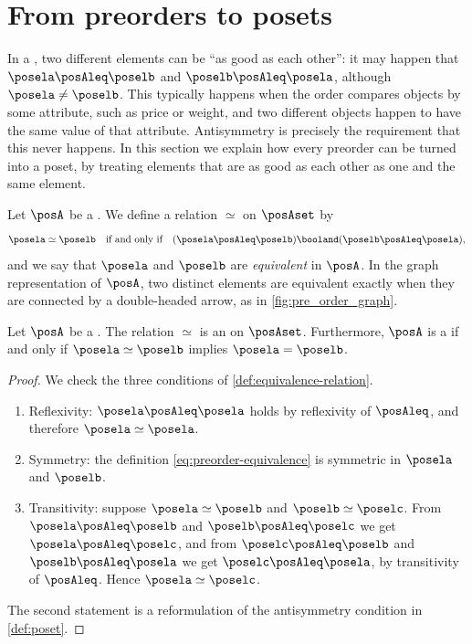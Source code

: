 
\section{From preorders to posets}
\label{sec:preorders-to-posets}

In a , two different elements can be ``as good as each other'': it may happen that $\posela \posAleq \poselb$ and $\poselb \posAleq \posela$, although $\posela \neq \poselb$.
This typically happens when the order compares objects by some attribute, such as price or weight, and two different objects happen to have the same value of that attribute.
Antisymmetry is precisely the requirement that this never happens.
In this section we explain how every preorder can be turned into a poset, by treating elements that are as good as each other as one and the same element.

Let $\posA$ be a .
We define a relation $\simeq$ on $\posAset$ by
\begin{equation}
    \label{eq:preorder-equivalence}
    \posela \simeq \poselb
    \quad \text{if and only if} \quad
    (\posela \posAleq \poselb) \booland (\poselb \posAleq \posela),
\end{equation}
and we say that $\posela$ and $\poselb$ are \emph{equivalent} in $\posA$.
In the graph representation of $\posA$, two distinct elements are equivalent exactly when they are connected by a double-headed arrow, as in \cref{fig:pre_order_graph}.

\begin{lemma}
    \label{lem:preorder-equivalence}
    Let $\posA$ be a .
    The relation $\simeq$ is an  on $\posAset$.
    Furthermore, $\posA$ is a  if and only if $\posela \simeq \poselb$ implies $\posela = \poselb$.
\end{lemma}
\begin{proof}
    We check the three conditions of \cref{def:equivalence-relation}.
    \begin{enumerate}
        \item Reflexivity: $\posela \posAleq \posela$ holds by reflexivity of $\posAleq$, and therefore $\posela \simeq \posela$.
        \item Symmetry: the definition \eqref{eq:preorder-equivalence} is symmetric in $\posela$ and $\poselb$.
        \item Transitivity: suppose $\posela \simeq \poselb$ and $\poselb \simeq \poselc$.
        From $\posela \posAleq \poselb$ and $\poselb \posAleq \poselc$ we get $\posela \posAleq \poselc$, and from $\poselc \posAleq \poselb$ and $\poselb \posAleq \posela$ we get $\poselc \posAleq \posela$, by transitivity of $\posAleq$.
        Hence $\posela \simeq \poselc$.
    \end{enumerate}
    The second statement is a reformulation of the antisymmetry condition in \cref{def:poset}.
\end{proof}

